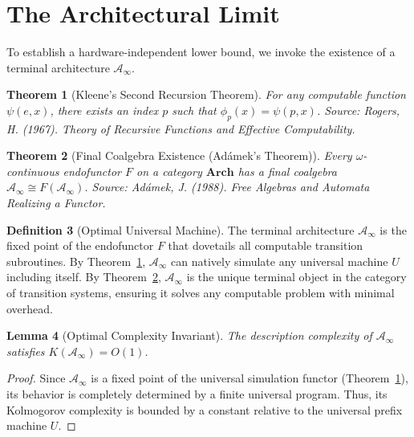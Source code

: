 \documentclass[12pt,a4paper]{article}
\theoremstyle{plain}
\newtheorem{theorem}{Theorem}[section]
\newtheorem{lemma}[theorem]{Lemma}
\theoremstyle{definition}
\newtheorem{definition}[theorem]{Definition}
\begin{document}
\section{The Architectural Limit} \label{sec:coalgebra}

To establish a hardware-independent lower bound, we invoke the existence of a terminal 
architecture $\mathcal{A}_\infty$.

\begin{theorem}[Kleene's Second Recursion Theorem] \label{thm:kleene}
For any computable function $\psi(e, x)$, there exists an index $p$ such that $\phi_p(x) = 
\psi(p, x)$. 
\small{\textit{Source: Rogers, H. (1967). Theory of Recursive Functions and Effective Computability.}}
\end{theorem}

\begin{theorem}[Final Coalgebra Existence (Adámek's Theorem)] \label{thm:adamek}
Every $\omega$-continuous endofunctor $F$ on a category $\mathbf{Arch}$ has a final 
coalgebra $\mathcal{A}_\infty \cong F(\mathcal{A}_\infty)$.
\small{\textit{Source: Adámek, J. (1988). Free Algebras and Automata Realizing a Functor.}}
\end{theorem}

\begin{definition}[Optimal Universal Machine] \label{def:opt_machine}
The terminal architecture $\mathcal{A}_\infty$ is the fixed point of the endofunctor $F$ that 
dovetails all computable transition subroutines. By Theorem~\ref{thm:kleene}, $\mathcal{A}_\infty$
can natively simulate any universal machine $U$ including itself. By Theorem~\ref{thm:adamek}, 
$\mathcal{A}_\infty$ is the unique terminal object in the category of transition systems, 
ensuring it solves any computable problem with minimal overhead.
\end{definition}

\begin{lemma}[Optimal Complexity Invariant] \label{lem:invariant}
The description complexity of $\mathcal{A}_\infty$ satisfies $K(\mathcal{A}_\infty) = O(1)$.
\end{lemma}
\begin{proof}
Since $\mathcal{A}_\infty$ is a fixed point of the universal simulation functor (Theorem~\ref{thm:kleene}), its behavior is completely determined by a finite universal program. Thus, 
its Kolmogorov complexity is bounded by a constant relative to the universal prefix machine $U$.
\end{proof}
\end{document}
